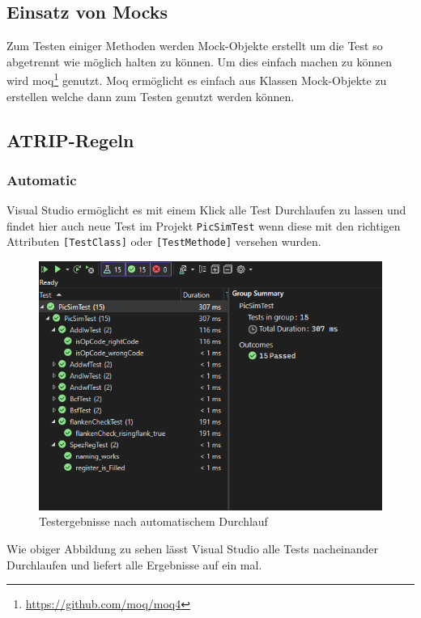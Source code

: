 \documentclass[12pt,a4paper,titlepage,ngerman,pdftex]{report}
\begin{document}
	\subsection{Einsatz von Mocks}
	Zum Testen einiger Methoden werden Mock-Objekte erstellt um die Test so abgetrennt wie möglich halten zu können.
	Um dies einfach machen zu können wird moq\footnote{\url{https://github.com/moq/moq4}} genutzt.
	Moq ermöglicht es einfach aus Klassen Mock-Objekte zu erstellen welche dann zum Testen genutzt werden können.
	
	\subsection{ATRIP-Regeln}
	\label{subsec:atrip-regeln}
	
	\subsubsection{Automatic}
	Visual Studio ermöglicht es mit einem Klick alle Test Durchlaufen zu lassen und findet hier auch neue Test im Projekt \verb|PicSimTest| wenn diese mit den richtigen Attributen \verb|[TestClass]| oder \verb|[TestMethode]| versehen wurden.
	\begin{figure}
		\centering
		\includegraphics[width = \linewidth]{"images/testergebnisse.png"}
		\caption{Testergebnisse nach automatischem Durchlauf}
	\end{figure}
	Wie obiger Abbildung zu sehen lässt Visual Studio alle Tests nacheinander Durchlaufen und liefert alle Ergebnisse auf ein mal.
	
\end{document}
